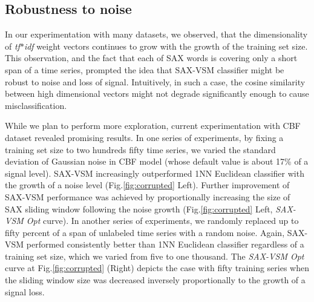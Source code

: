 \documentclass{llncs}
\begin{document}
\subsection{Robustness to noise}
In our experimentation with many datasets, we observed, that the dimensionality of \textit{tf$\ast$idf} 
weight vectors continues to grow with the growth of the training set size. 
This observation, and the fact that each of SAX words is covering only a short span of a time 
series, prompted the idea that SAX-VSM classifier might be robust to noise and loss of signal.
Intuitively, in such a case, the cosine similarity between high dimensional 
vectors might not degrade significantly enough to cause misclassification.

While we plan to perform more exploration, current experimentation with CBF dataset revealed 
promising results. 
In one series of experiments, by fixing a training set size to two hundreds fifty time series, we
varied the standard deviation of Gaussian noise in CBF model (whose default value is about 
17\% of a signal level). SAX-VSM increasingly outperformed 1NN Euclidean classifier 
with the growth of a noise level (Fig.\ref{fig:corrupted} Left). 
Further improvement of SAX-VSM performance was achieved by proportionally increasing
the size of SAX sliding window following the noise growth (Fig.\ref{fig:corrupted}
Left, \textit{SAX-VSM Opt} curve). 
In another series of experiments, we randomly replaced up to fifty percent of a span of unlabeled
time series with a random noise. Again, SAX-VSM performed consistently better than 
1NN Euclidean classifier regardless of a training set size, which we varied from five to
one thousand. The \textit{SAX-VSM Opt} curve at Fig.\ref{fig:corrupted} (Right) depicts the case
with fifty training series when the sliding window size was decreased inversely proportionally 
to the growth of a signal loss.
\end{document}

